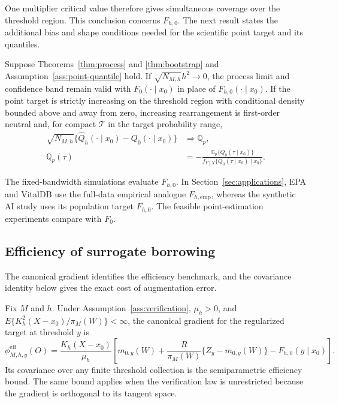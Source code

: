 One multiplier critical value therefore gives simultaneous coverage over the
threshold region. This conclusion concerns \(F_{h,0}\). The next result states
the additional bias and shape conditions needed for the scientific point
target and its quantiles.

\begin{corollary}
\label{cor:F0}
\label{cor:quantile}
Suppose Theorems~\ref{thm:process} and \ref{thm:bootstrap} and
Assumption~\ref{ass:point-quantile} hold. If
\(\sqrt{N_{M,h}}h^2\to0\), the process limit and confidence band remain valid
with \(F_0(\cdot\mid x_0)\) in place of \(F_{h,0}(\cdot\mid x_0)\). If the point
target is strictly increasing on the threshold region with conditional density
bounded above and away from zero, increasing rearrangement is first-order
neutral and, for compact \(\mathcal T\) in the target probability range,
\begin{align}
\sqrt{N_{M,h}}
\{\widehat Q_h(\cdot\mid x_0)-Q_0(\cdot\mid x_0)\}
&\Rightarrow
\mathbb Q_p,
\label{eq:quantile-limit}\\
\mathbb Q_p(\tau)
&=-
\frac{\mathbb G_p\{Q_0(\tau\mid x_0)\}}
{f_{Y\mid X}\{Q_0(\tau\mid x_0)\mid x_0\}}.
\label{eq:quantile-gaussian-limit}
\end{align}
\end{corollary}

The fixed-bandwidth simulations evaluate \(F_{h,0}\). In
Section~\ref{sec:applications}, EPA and VitalDB use the full-data empirical
analogue \(F_{h,\mathrm{emp}}\), whereas the synthetic AI study uses its
population target \(F_{h,0}\). The feasible point-estimation experiments compare with
\(F_0\).

\subsection{Efficiency of surrogate borrowing}

The canonical gradient identifies the efficiency benchmark, and the covariance
identity below gives the exact cost of augmentation error.

\begin{theorem}
\label{thm:efficiency}
Fix \(M\) and \(h\). Under Assumption~\ref{ass:verification},
\(\mu_h>0\), and
\(E\{K_h^2(X-x_0)/\pi_M(W)\}<\infty\), the canonical gradient for the
regularized target at threshold \(y\) is
\begin{equation}
\phi_{M,h,y}^{\mathrm{eff}}(O)
=
\frac{K_h(X-x_0)}{\mu_h}
\left[
m_{0,y}(W)
+\frac{R}{\pi_M(W)}\{Z_y-m_{0,y}(W)\}
-F_{h,0}(y\mid x_0)
\right].
\label{eq:efficient-if-threshold}
\end{equation}
Its covariance over any finite threshold collection is the semiparametric
efficiency bound. The same bound applies when the verification law is
unrestricted because the gradient is orthogonal to its tangent space.
\end{theorem}

